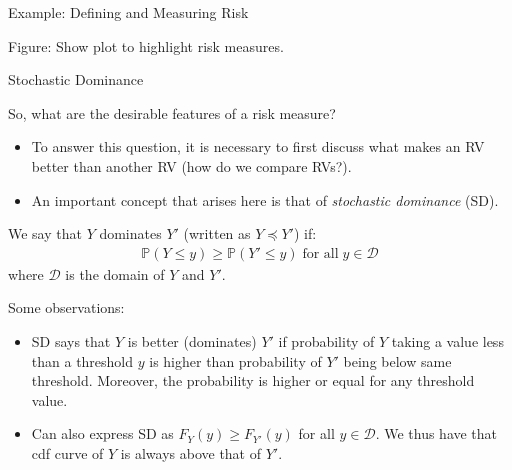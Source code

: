 \documentclass[9pt]{beamer}
\begin{document}
%
\begin{frame}{Example: Defining and Measuring Risk}

\begin{block}{}
Figure: Show plot to highlight risk measures. 
\end{block}

\end{frame}


%
\begin{frame}{Stochastic Dominance}
\begin{block}{}
So, what are the desirable features of a risk measure?
\end{block}
\begin{itemize}
\item To answer this question, it is necessary to first discuss what makes an RV better than another RV (how do we compare RVs?). 

\item An important concept that arises here is that of {\em stochastic dominance} (SD).

\end{itemize}

\begin{block}{}
We say that $Y$ dominates $Y'$ (written as $Y\preceq Y'$) if:
\begin{align*}
\mathbb{P}(Y\leq y)\geq \mathbb{P}(Y'\leq y)\; \textrm{for all}\;  y\in \mathcal{D}
\end{align*}
where $\mathcal{D}$ is the domain of $Y$ and $Y'$. 
\end{block}
Some observations:
\begin{itemize}
\item SD says that $Y$ is better (dominates) $Y'$ if probability of $Y$ taking a value less than a threshold $y$ is higher than probability of $Y'$ being below same threshold. Moreover, the probability is higher or equal for any threshold value. 
\item Can also express SD as $F_{Y}(y)\geq F_{Y'}(y)$ for all $y\in\mathcal{D}$. We thus have that cdf curve of $Y$ is always above that of $Y'$. 

\end{itemize}


\end{frame}
\end{document}
